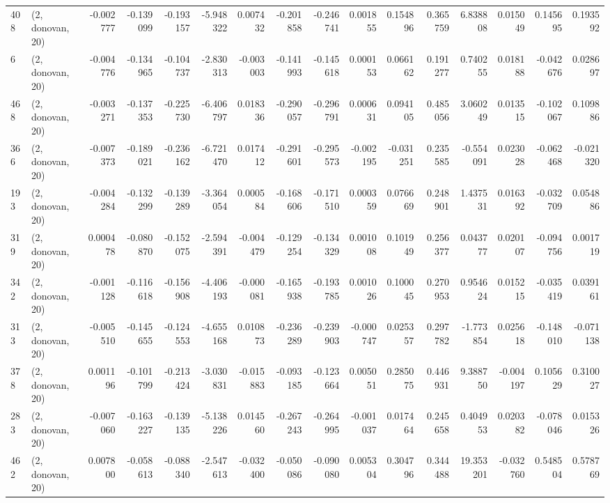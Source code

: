 \begin{tabular}{llrrrrrrrrrrrrrr}
408 &  (2, donovan, 20) &  -0.002777 & -0.139099 & -0.193157 &   -5.948322 &  0.007432 &  -0.201858 & -0.246741 &  0.001855 &  0.154896 &  0.365759 &    6.838808 &  0.015049 &  0.145695 &  0.193592 \\
6   &  (2, donovan, 20) &  -0.004776 & -0.134965 & -0.104737 &   -2.830313 & -0.003003 &  -0.141993 & -0.145618 &  0.000153 &  0.066162 &  0.191277 &    0.740255 &  0.018188 & -0.042676 &  0.028697 \\
468 &  (2, donovan, 20) &  -0.003271 & -0.137353 & -0.225730 &   -6.406797 &  0.018336 &  -0.290057 & -0.296791 &  0.000631 &  0.094105 &  0.485056 &    3.060249 &  0.013515 & -0.102067 &  0.109886 \\
366 &  (2, donovan, 20) &  -0.007373 & -0.189021 & -0.236162 &   -6.721470 &  0.017412 &  -0.291601 & -0.295573 & -0.002195 & -0.031251 &  0.235585 &   -0.554091 &  0.023028 & -0.062468 & -0.021320 \\
193 &  (2, donovan, 20) &  -0.004284 & -0.132299 & -0.139289 &   -3.364054 &  0.000584 &  -0.168606 & -0.171510 &  0.000359 &  0.076669 &  0.248901 &    1.437531 &  0.016392 & -0.032709 &  0.054886 \\
319 &  (2, donovan, 20) &   0.000478 & -0.080870 & -0.152075 &   -2.594391 & -0.004479 &  -0.129254 & -0.134329 &  0.001008 &  0.101949 &  0.256377 &    0.043777 &  0.020107 & -0.094756 &  0.001719 \\
342 &  (2, donovan, 20) &  -0.001128 & -0.116618 & -0.156908 &   -4.406193 & -0.000081 &  -0.165938 & -0.193785 &  0.001026 &  0.100045 &  0.270953 &    0.954624 &  0.015215 & -0.035419 &  0.039161 \\
313 &  (2, donovan, 20) &  -0.005510 & -0.145655 & -0.124553 &   -4.655168 &  0.010873 &  -0.236289 & -0.239903 & -0.000747 &  0.025357 &  0.297782 &   -1.773854 &  0.025618 & -0.148010 & -0.071138 \\
378 &  (2, donovan, 20) &   0.001196 & -0.101799 & -0.213424 &   -3.030831 & -0.015883 &  -0.093185 & -0.123664 &  0.005051 &  0.285075 &  0.446931 &    9.388750 & -0.004197 &  0.105629 &  0.310027 \\
283 &  (2, donovan, 20) &  -0.007060 & -0.163227 & -0.139135 &   -5.138226 &  0.014560 &  -0.267243 & -0.264995 & -0.001037 &  0.017464 &  0.245658 &    0.404953 &  0.020382 & -0.078046 &  0.015326 \\
462 &  (2, donovan, 20) &   0.007800 & -0.058613 & -0.088340 &   -2.547613 & -0.032400 &  -0.050086 & -0.090080 &  0.005304 &  0.304796 &  0.344488 &   19.353201 & -0.032760 &  0.548504 &  0.578769 \\

\end{tabular}
